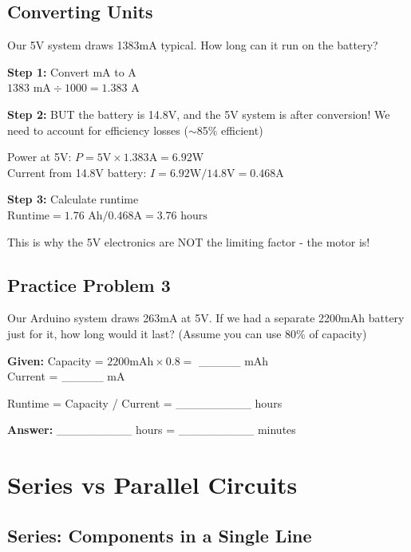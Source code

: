 \documentclass[11pt,letterpaper]{article}
\begin{document}
\subsection{Converting Units}

Our 5V system draws 1383mA typical. How long can it run on the battery?

\textbf{Step 1:} Convert mA to A\\
$1383\text{ mA} \div 1000 = 1.383\text{ A}$

\textbf{Step 2:} BUT the battery is 14.8V, and the 5V system is after conversion! We need to account for efficiency losses ($\sim$85\% efficient)

Power at 5V: $P = 5\text{V} \times 1.383\text{A} = 6.92\text{W}$\\
Current from 14.8V battery: $I = 6.92\text{W} / 14.8\text{V} = 0.468\text{A}$

\textbf{Step 3:} Calculate runtime\\
$\text{Runtime} = 1.76\text{ Ah} / 0.468\text{A} = 3.76\text{ hours}$

This is why the 5V electronics are NOT the limiting factor - the motor is!

\subsection{Practice Problem 3}

Our Arduino system draws 263mA at 5V. If we had a separate 2200mAh battery just for it, how long would it last? (Assume you can use 80\% of capacity)

\textbf{Given:} Capacity = $2200\text{mAh} \times 0.8 = $ \_\_\_\_\_ mAh\\
Current = \_\_\_\_\_ mA

Runtime = Capacity / Current = \_\_\_\_\_\_\_\_\_ hours

\textbf{Answer:} \_\_\_\_\_\_\_\_\_ hours = \_\_\_\_\_\_\_\_\_ minutes

\section{Series vs Parallel Circuits}

\subsection{Series: Components in a Single Line}
\end{document}
